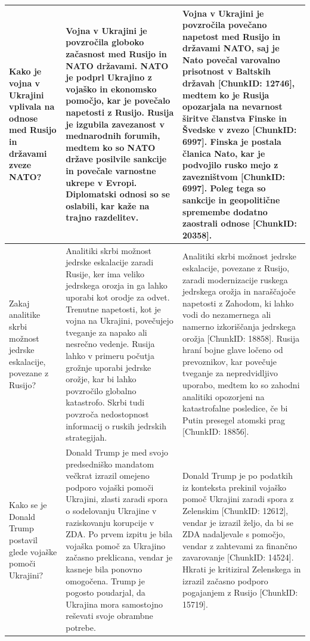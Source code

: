 \documentclass[conference]{IEEEtran}
\begin{document}
\begin{longtable}{p{} p{} p{}}
Kako je vojna v Ukrajini vplivala na odnose med Rusijo in državami zveze NATO? & Vojna v Ukrajini je povzročila globoko začasnost med Rusijo in NATO državami. NATO je podprl Ukrajino z vojaško in ekonomsko pomočjo, kar je povečalo napetosti z Rusijo. Rusija je izgubila zavezanost v mednarodnih forumih, medtem ko so NATO države posilvile sankcije in povečale varnostne ukrepe v Evropi. Diplomatski odnosi so se oslabili, kar kaže na trajno razdelitev. & Vojna v Ukrajini je povzročila povečano napetost med Rusijo in državami NATO, saj je Nato povečal varovalno prisotnost v Baltskih državah [ChunkID: 12746], medtem ko je Rusija opozarjala na nevarnost širitve članstva Finske in Švedske v zvezo [ChunkID: 6997]. Finska je postala članica Nato, kar je podvojilo rusko mejo z zavezništvom [ChunkID: 6997]. Poleg tega so sankcije in geopolitične spremembe dodatno zaostrali odnose [ChunkID: 20358]. \\ \hline
Zakaj analitike skrbi možnost jedrske eskalacije, povezane z Rusijo? & Analitiki skrbi možnost jedrske eskalacije zaradi Rusije, ker ima veliko jedrskega orozja in ga lahko uporabi kot orodje za odvet. Trenutne napetosti, kot je vojna na Ukrajini, povečujejo tveganje za napako ali nesrečno vedenje. Rusija lahko v primeru počutja grožnje uporabi jedrske orožje, kar bi lahko povzročilo globalno katastrofo. Skrbi tudi povzroča nedostopnost informacij o ruskih jedrskih strategijah. & Analitiki skrbi možnost jedrske eskalacije, povezane z Rusijo, zaradi modernizacije ruskega jedrskega orožja in naraščajoče napetosti z Zahodom, ki lahko vodi do nezamernega ali namerno izkoriščanja jedrskega orožja [ChunkID: 18858]. Rusija hraní bojne glave ločeno od prevoznikov, kar povečuje tveganje za nepredvidljivo uporabo, medtem ko so zahodni analitiki opozorjeni na katastrofalne posledice, če bi Putin presegel atomski prag [ChunkID: 18856]. \\ \hline
Kako se je Donald Trump postavil glede vojaške pomoči Ukrajini? & Donald Trump je med svojo predsedniško mandatom večkrat izrazil omejeno podporo vojaški pomoči Ukrajini, zlasti zaradi spora o sodelovanju Ukrajine v raziskovanju korupcije v ZDA. Po prvem izpitu je bila vojaška pomoč za Ukrajino začasno preklicana, vendar je kasneje bila ponovno omogočena. Trump je pogosto poudarjal, da Ukrajina mora samostojno reševati svoje obrambne potrebe. & Donald Trump je po podatkih iz konteksta prekinil vojaško pomoč Ukrajini zaradi spora z Zelenskim [ChunkID: 12612], vendar je izrazil željo, da bi se ZDA nadaljevale s pomočjo, vendar z zahtevami za finančno zavarovanje [ChunkID: 14524]. Hkrati je kritiziral Zelenskega in izrazil začasno podporo pogajanjem z Rusijo [ChunkID: 15719]. \\ \hline

\end{longtable}
\end{document}

